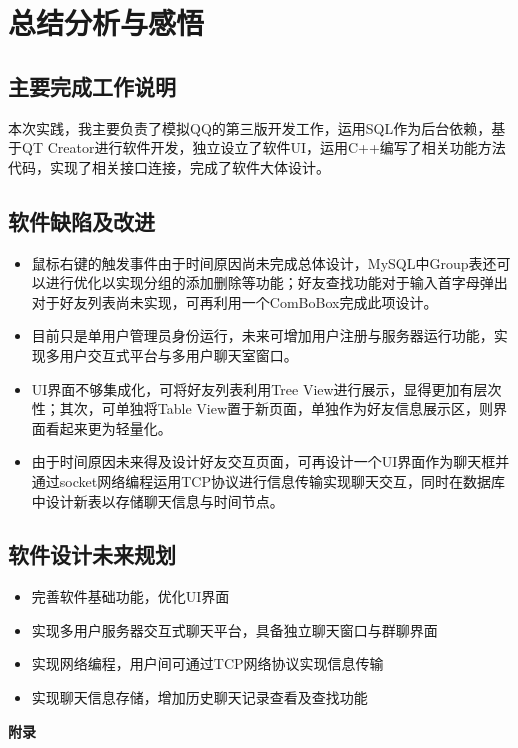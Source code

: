 \documentclass{progartcn}
\begin{document}
\section{总结分析与感悟}

\subsection{主要完成工作说明}
本次实践，我主要负责了模拟QQ的第三版开发工作，运用SQL作为后台依赖，基于QT Creator进行软件开发，独立设立了软件UI，运用C++编写了相关功能方法代码，实现了相关接口连接，完成了软件大体设计。

\subsection{软件缺陷及改进}
\begin{itemize}[itemsep=0.01pt]
\item	鼠标右键的触发事件由于时间原因尚未完成总体设计，MySQL中Group表还可以进行优化以实现分组的添加删除等功能；好友查找功能对于输入首字母弹出对于好友列表尚未实现，可再利用一个ComBoBox完成此项设计。
\item	目前只是单用户管理员身份运行，未来可增加用户注册与服务器运行功能，实现多用户交互式平台与多用户聊天室窗口。
\item	UI界面不够集成化，可将好友列表利用Tree View进行展示，显得更加有层次性；其次，可单独将Table View置于新页面，单独作为好友信息展示区，则界面看起来更为轻量化。
\item	由于时间原因未来得及设计好友交互页面，可再设计一个UI界面作为聊天框并通过socket网络编程运用TCP协议进行信息传输实现聊天交互，同时在数据库中设计新表以存储聊天信息与时间节点。
\end{itemize}

\subsection{软件设计未来规划}
\begin{itemize}[itemsep=0.01pt]
\item	完善软件基础功能，优化UI界面
\item	实现多用户服务器交互式聊天平台，具备独立聊天窗口与群聊界面
\item	实现网络编程，用户间可通过TCP网络协议实现信息传输
\item	实现聊天信息存储，增加历史聊天记录查看及查找功能
\end{itemize}

\newpage
\begin{center}
	\Large{\textbf{\heiti 附录}}
\end{center}
\end{document}
